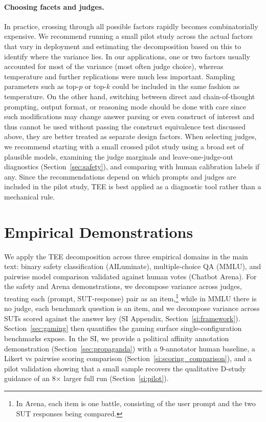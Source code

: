 \documentclass{article}
\begin{document}
\paragraph{Choosing facets and judges.}
In practice, crossing through all possible factors rapidly becomes combinatorially expensive. We recommend running a small pilot study across the actual factors that vary in deployment and estimating the decomposition based on this to identify where the variance lies. In our applications, one or two factors usually accounted for most of the variance (most often judge choice), whereas temperature and further replications were much less important. Sampling parameters such as top-$p$ or top-$k$ could be included in the same fashion as temperature. On the other hand, switching between direct and chain-of-thought prompting, output format, or reasoning mode should be done with care since such modifications may change answer parsing or even construct of interest and thus cannot be used without passing the construct equivalence test discussed above, they are better treated as separate design factors. When selecting judges, we recommend starting with a small crossed pilot study using a broad set of plausible models, examining the judge marginals and leave-one-judge-out diagnostics (Section~\ref{sec:safety}), and comparing with human calibration labels if any. Since the recommendations depend on which prompts and judges are included in the pilot study, TEE is best applied as a diagnostic tool rather than a mechanical rule.


\section{Empirical Demonstrations}
\label{sec:empirical}

We apply the TEE decomposition across three empirical domains in the main text: binary safety classification (AILuminate), multiple-choice QA (MMLU), and pairwise model comparison validated against human votes (Chatbot Arena). For the safety and Arena demonstrations, we decompose variance across judges, treating each (prompt, SUT-response) pair as an item,\footnote{In Arena, each item is one battle, consisting of the user prompt and the two SUT responses being compared.} while in MMLU there is no judge, each benchmark question is an item, and we decompose variance across SUTs scored against the answer key (SI Appendix, Section~\ref{si:framework}). Section~\ref{sec:gaming} then quantifies the gaming surface single-configuration benchmarks expose. In the SI, we provide a political affinity annotation demonstration (Section~\ref{sec:propaganda}) with a 9-annotator human baseline, a Likert vs pairwise scoring comparison (Section~\ref{si:scoring_comparison}), and a pilot validation showing that a small sample recovers the qualitative D-study guidance of an 8$\times$ larger full run (Section~\ref{si:pilot}).
\end{document}
